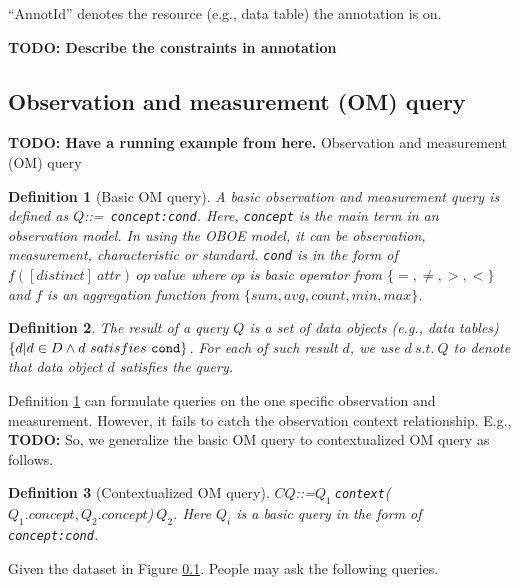 \documentclass[conference]{IEEEtran}
\newtheorem{definition}{Definition}[section]
\begin{document}
``AnnotId'' denotes the resource (e.g., data table) the annotation is on.

{\bf TODO: Describe the constraints in annotation}

\subsection{Observation and measurement (OM) query}

{\bf TODO: Have a running example from here.}
Observation and measurement (OM) query

\begin{definition}[Basic OM query]\label{def:basic_omq}
A basic observation and measurement query is defined as $Q$::={\tt
  concept:cond}. 
Here, {\tt concept} is the main term in an observation model. 
In using the OBOE model, it can be observation, measurement,
characteristic or standard. 
{\tt cond} is in the form of $f([distinct]~attr)~op~value$ where $op$ is
basic operator from $\{=, \neq, >, <\}$ and $f$ is an
aggregation function from $\{sum, avg, count, min, max\}$. 
\end{definition}

\begin{definition}\label{def:qresult}
The result of a query $Q$ is a set of data objects (e.g., data tables) 
$\{d|d\in D \wedge d~satisfies~{\tt cond}\}$. 
For each of such result $d$, we use $d~s.t.~Q$ to denote that
data object $d$ satisfies the query. 
\end{definition}
 
Definition \ref{def:basic_omq} can formulate queries on the
one specific observation and measurement. 
However, it fails to catch the observation context relationship. 
E.g., {\bf TODO: }
So, we generalize the basic OM query to contextualized OM query as
follows. 

\begin{definition}[Contextualized OM query]\label{def:context_omq}
$CQ$::=$Q_1~${\tt context}($Q_1.concept, Q_2.concept$)$~Q_2$. Here $Q_i$ is a basic query
in the form of {\tt concept:cond}. 
\end{definition}

Given the dataset in Figure \ref{}. 
People may ask the following queries. 
\end{document}
